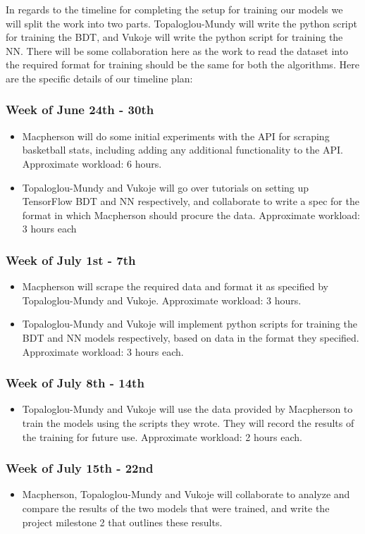 \documentclass[letterpaper]{article} %
\begin{document}
In regards to the timeline for completing the setup for training our models we will split the work into two parts. Topaloglou-Mundy will write the python script for training the BDT, and Vukoje will write the python script for training the NN. There will be some collaboration here as the work to read the dataset into the required format for training should be the same for both the algorithms. Here are the specific details of our timeline plan:
\subsubsection{Week of June 24th - 30th}
\begin{itemize}
\item Macpherson will do some initial experiments with the API for scraping basketball stats, including adding any additional functionality to the API. Approximate workload: 6 hours.
\item Topaloglou-Mundy and Vukoje will go over tutorials on setting up TensorFlow BDT and NN respectively, and collaborate to write a spec for the format in which Macpherson should procure the data. Approximate workload: 3 hours each
\end{itemize}
\subsubsection{Week of July 1st - 7th}
\begin{itemize}
\item Macpherson will scrape the required data and format it as specified by Topaloglou-Mundy and Vukoje. Approximate workload: 3 hours.
\item Topaloglou-Mundy and Vukoje will implement python scripts for training the BDT and NN models respectively, based on data in the format they specified. Approximate workload: 3 hours each.
\end{itemize}
\subsubsection{Week of July 8th - 14th}
\begin{itemize}
\item Topaloglou-Mundy and Vukoje will use the data provided by Macpherson to train the models using the scripts they wrote. They will record the results of the training for future use. Approximate workload: 2 hours each.
\end{itemize}
\subsubsection{Week of July 15th - 22nd}
\begin{itemize}
\item Macpherson, Topaloglou-Mundy and Vukoje will collaborate to analyze and compare the results of the two models that were trained, and write the project milestone 2 that outlines these results.
\end{itemize}
\end{document}

